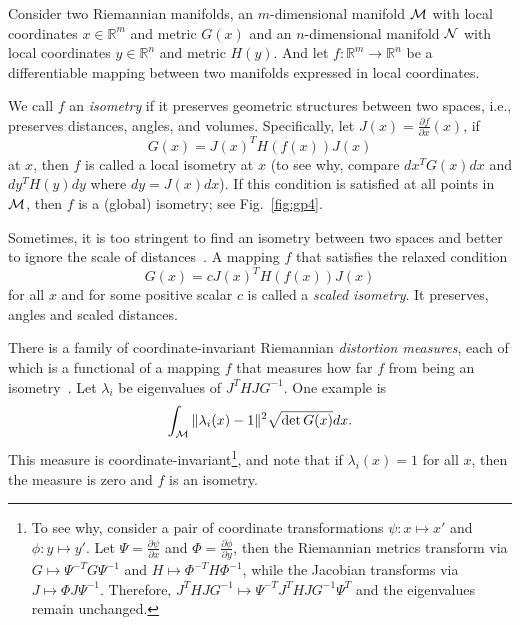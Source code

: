 Consider two Riemannian manifolds, an $m$-dimensional manifold ${\cal M}$ with local coordinates $x\in\mathbb{R}^{m}$ and metric $G(x)$ and an $n$-dimensional manifold ${\cal N}$ with local coordinates $y\in\mathbb{R}^{n}$ and metric $H(y)$. And let $f:\mathbb{R}^{m} \to \mathbb{R}^{n}$ be a differentiable mapping between two manifolds expressed in local coordinates. 

We call $f$ an {\it isometry} if it preserves geometric structures between two spaces, i.e., preserves distances, angles, and volumes. Specifically, let $J(x)=\frac{\partial f}{\partial x}(x)$, if 
\begin{equation}
    G(x) = J(x)^T H(f(x)) J(x)
\end{equation}
at $x$, then $f$ is called a local isometry at $x$ (to see why, compare $dx^TG(x)dx$ and $dy^T H(y)dy$ where $dy=J(x)dx$). If this condition is satisfied at all points in ${\cal M}$, then $f$ is a (global) isometry; see Fig.~\ref{fig:gp4}. 

Sometimes, it is too stringent to find an isometry between two spaces and better to ignore the scale of distances~\cite{yonghyeon2022regularized}. A mapping $f$ that satisfies the relaxed condition
\begin{equation}
\label{eq:lsic}
    G(x) = cJ(x)^T H(f(x)) J(x)
\end{equation}
for all $x$ and for some positive scalar $c$ is called a {\it scaled isometry}. It preserves, angles and scaled distances.

There is a family of coordinate-invariant Riemannian {\it distortion measures}, each of which is a functional of a mapping $f$ that measures how far $f$ from being an isometry~\cite{jang2021riemannian}. 
Let $\lambda_i$ be eigenvalues of $J^T H J G^{-1}$. One example is  
\begin{equation}
    \int_{\cal M} \|\lambda_i(x) - 1\|^2 \sqrt{\det G(x)} dx.
\end{equation}
This measure is coordinate-invariant\footnote{To see why, consider a pair of coordinate transformations $\psi: x\mapsto x'$ and $\phi: y \mapsto y'$. Let $\Psi = \frac{\partial \psi}{\partial x}$ and $\Phi=\frac{\partial \phi}{\partial y}$, then the Riemannian metrics transform via $G\mapsto \Psi^{-T} G \Psi^{-1}$ and $H\mapsto \Phi^{-T}H\Phi^{-1}$, while the Jacobian transforms via $J\mapsto \Phi J \Psi^{-1}$. Therefore, $J^T H J G^{-1} \mapsto \Psi^{-T}J^T H J G^{-1}\Psi^{T}$ and the eigenvalues remain unchanged.}, and note that if $\lambda_i(x)=1$ for all $x$, then the measure is zero and $f$ is an isometry.


